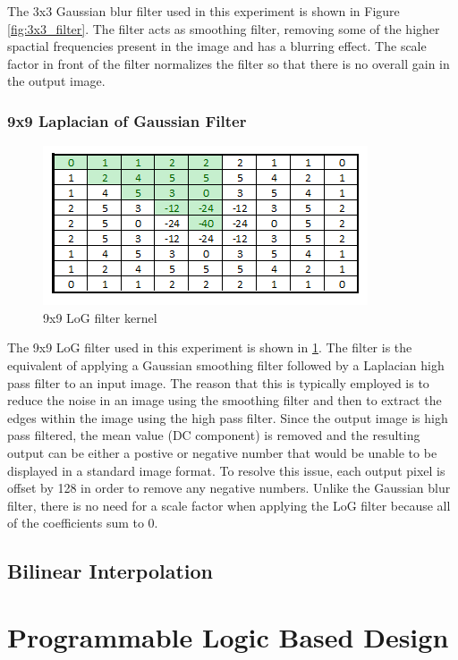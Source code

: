 The 3x3 Gaussian blur filter used in this experiment is shown in Figure \ref{fig:3x3_filter}. The filter acts as smoothing filter, removing some of the higher spactial frequencies present in the image and has a blurring effect.  The scale factor in front of the filter normalizes the filter so that there is no overall gain in the output image.

\subsubsection{9x9 Laplacian of Gaussian Filter}
\begin{figure}[h]
  \centering
  \includegraphics{./img/filter_9x9_values.PNG}
  \caption{9x9 LoG filter kernel}
  \label{fig:9x9_filter}
\end{figure}

The 9x9 LoG filter used in this experiment is shown in \ref{fig:9x9_filter}.  The filter is the equivalent of applying a Gaussian smoothing filter followed by a Laplacian high pass filter to an input image.  The reason that this is typically employed is to reduce the noise in an image using the smoothing filter and then to extract the edges within the image using the high pass filter.  Since the output image is high pass filtered, the mean value (DC component) is removed and the resulting output can be either a postive or negative number that would be unable to be displayed in a standard image format.  To resolve this issue, each output pixel is offset by 128 in order to remove any negative numbers.  Unlike the Gaussian blur filter, there is no need for a scale factor when applying the LoG filter because all of the coefficients sum to 0.

\subsection{Bilinear Interpolation}

\section{Programmable Logic Based Design}

